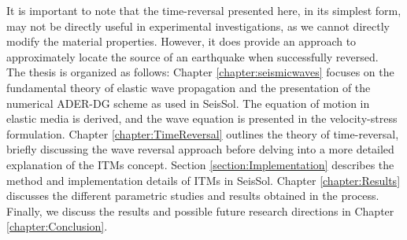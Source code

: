 It is important to note that the time-reversal presented here, in its simplest form, may not be directly useful in experimental 
investigations, as we cannot directly modify the material properties. However, it does provide an approach to approximately 
locate the source of an earthquake when successfully reversed. \\

The thesis is organized as follows: Chapter \ref{chapter:seismicwaves} focuses on the fundamental theory of elastic wave propagation and the presentation
of the numerical \ac{ADER}-\ac{DG} scheme as used in SeisSol. The equation of motion in elastic media is derived, and the wave equation is presented
in the velocity-stress formulation. Chapter \ref{chapter:TimeReversal} outlines the theory of time-reversal, briefly discussing the wave reversal approach before
delving into a more detailed explanation of the \ac{ITM}s concept. Section \ref{section:Implementation} describes the method and implementation details of \ac{ITM}s
in SeisSol. Chapter \ref{chapter:Results} discusses the different parametric studies and results obtained in the process. Finally, we discuss the results
and possible future research directions in Chapter \ref{chapter:Conclusion}. 

